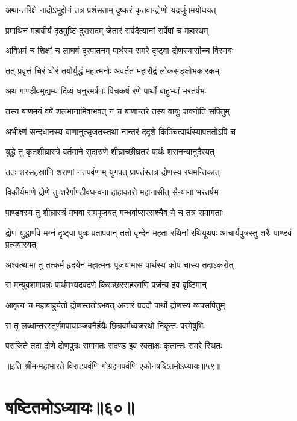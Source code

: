 \twolineshloka
{अथान्तरिक्षे नादोऽभूद्द्रोणं तत्र प्रशंसताम्}
{दुष्करं कृतवान्द्रोणो यदर्जुनमयोधयत्}


\twolineshloka
{प्रमाथिनं महावीर्यं दृढमुष्टिं दुरासदम्}
{जेतारं सर्वदैत्यानां सर्वेषां च महारथम्}


\twolineshloka
{अविभ्रमं च शिक्षां च लाघवं दूरपातनम्}
{पार्थस्य समरे दृष्ट्वा द्रोणस्यासीच्च विस्मयः}


\twolineshloka
{तत् प्रवृत्तं चिरं घोरं तयोर्युद्धं महात्मनोः}
{अवर्तत महारौद्रं लोकसङ्क्षोभकारकम्}


\twolineshloka
{अथ गाण्डीवमुद्यम्य दिव्यं धनुरमर्षणः}
{विचकर्ष रणे पार्थो बाहुभ्यां भरतर्षभः}


\twolineshloka
{तस्य बाणमयं वर्षे शलभानामिवाभवत्}
{न च बाणान्तरे तस्य वायुः शक्नोति सर्पितुम्}


\twolineshloka
{अभीक्ष्णं सन्दधानस्य बाणानुत्सृजतस्तथा}
{नान्तरं ददृशे किञ्चित्पार्थस्यापततोऽपि च}


\twolineshloka
{युद्धे तु कृतशीघ्रास्त्रे वर्तमाने सुदारुणे}
{शीघ्राच्छीघ्रतरं पार्थः शरानन्यानुदैरयत्}


\twolineshloka
{ततः शरसहस्राणि शराणां नतपर्वणाम्}
{युगपत् प्रापतंस्तत्र द्रोणस्य रथमन्तिकात्}


\twolineshloka
{विकीर्यमाणे द्रोणे तु शरैर्गाण्डीवधन्वना}
{हाहाकारो महानासीत् सैन्यानां भरतर्षभ}


\twolineshloka
{पाण्डवस्य तु शीघ्रास्त्रं मघवा समपूजयत्}
{गन्धर्वाप्सरसश्चैव ये च तत्र समागताः}


\threelineshloka
{द्रोणं युद्धार्णवे मग्नं दृष्ट्वा पुत्रः प्रतापवान्}
{ततो वृन्देन महता रथिनां रथियूथपः}
{आचार्यपुत्रस्तु शरैः पाण्डवं प्रत्यवारयत्}


\twolineshloka
{अश्वत्थामा तु तत्कर्म हृदयेन महात्मनः}
{पूजयामास पार्थस्य कोपं चास्य तदाऽकरोत्}


\twolineshloka
{स मन्युवशमापन्नः पार्थमभ्यद्रवद्रणे}
{किरञ्छरसहस्राणि पर्जन्य इव वृष्टिमान्}


\twolineshloka
{आवृत्य च महाबाहुर्यतो द्रोणस्ततोऽभवत्}
{अन्तरं प्रददौ पार्थो द्रोणस्य व्यपसर्पितुम्}


\twolineshloka
{स तु लब्धान्तरस्तूर्णमपायाञ्जवनैर्हयैः}
{छिन्नवर्मध्वजरथो निकृत्तः परमेषुभिः}


\twolineshloka
{पराजिते तदा द्रोणे द्रोणपुत्रः समागतः}
{सदण्ड इव रक्ताक्षः कृतान्तः समरे स्थितः}

॥इति श्रीमन्महाभारते विराटपर्वणि गोग्रहणपर्वणि एकोनषष्टितमोऽध्यायः॥५९॥

\chapter{षष्टितमोऽध्यायः॥६०॥}

